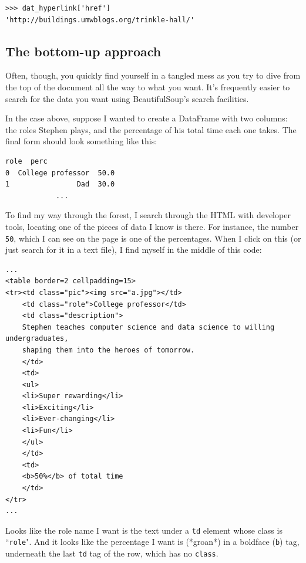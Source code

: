 \documentclass[12pt]{article}
\begin{document}
\begin{Verbatim}[fontsize=\small,samepage=true,frame=none]
>>> dat_hyperlink['href']
'http://buildings.umwblogs.org/trinkle-hall/'
\end{Verbatim}

\subsection{The bottom-up approach}

Often, though, you quickly find yourself in a tangled mess as you try to dive
from the top of the document all the way to what you want. It's frequently
easier to search for the data you want using BeautifulSoup's search
facilities.

In the case above, suppose I wanted to create a DataFrame with two columns:
the roles Stephen plays, and the percentage of his total time each one takes.
The final form should look something like this:

\begin{Verbatim}[fontsize=\small,samepage=true,frame=none]
                role  perc
0  College professor  50.0
1                Dad  30.0
            ...
\end{Verbatim}


To find my way through the forest, I search through the HTML with developer
tools, locating one of the pieces of data I know is there. For instance, the
number \texttt{50}, which I can see on the page is one of the percentages.
When I click on this (or just search for it in a text file), I find myself in
the middle of this code:

\footnotesize
\begin{Verbatim}[fontsize=\small,samepage=true,frame=none]
...
<table border=2 cellpadding=15>
<tr><td class="pic"><img src="a.jpg"></td>
    <td class="role">College professor</td>
    <td class="description">
    Stephen teaches computer science and data science to willing undergraduates,
    shaping them into the heroes of tomorrow.
    </td>
    <td>
    <ul>
    <li>Super rewarding</li>
    <li>Exciting</li>
    <li>Ever-changing</li>
    <li>Fun</li>
    </ul>
    </td>
    <td>
    <b>50%</b> of total time
    </td>
</tr>
...
\end{Verbatim}
\normalsize

Looks like the role name I want is the text under a \texttt{td} element whose
class is ``\texttt{role}". And it looks like the percentage I want is
(*groan*) in a boldface (\texttt{b}) tag, underneath the last \texttt{td} tag
of the row, which has no \texttt{class}.
\end{document}
